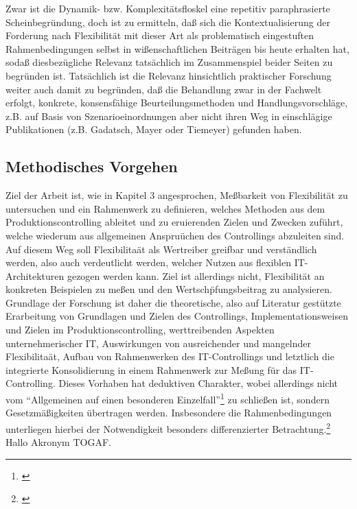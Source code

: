 Zwar ist die Dynamik- bzw. Komplexit\"atsfloskel eine repetitiv paraphrasierte Scheinbegr\"undung, doch ist zu ermitteln, da{\ss} sich die Kontextualisierung der Forderung nach Flexibilit\"at mit dieser Art als problematisch eingestuften Rahmenbedingungen selbst in wi{\ss}enschaftlichen Beitr\"agen bis heute erhalten hat, soda{\ss} diesbez\"ugliche Relevanz tats\"achlich im Zusammenspiel beider Seiten zu begr\"unden ist. 
Tats\"achlich ist die Relevanz hinsichtlich praktischer Forschung weiter auch damit zu begr\"unden, da{\ss} die Behandlung zwar in der Fachwelt erfolgt, konkrete, konsensf\"ahige Beurteilungsmethoden und Handlungsvorschl\"age, z.B. auf Basis von Szenarioeinordnungen aber nicht ihren Weg in einschl\"agige Publikationen (z.B. Gadatsch, Mayer oder Tiemeyer) gefunden haben.


\subsection{Methodisches Vorgehen}
Ziel der Arbeit ist, wie in Kapitel 3 angesprochen, Me{\ss}barkeit von Flexibilit\"at zu untersuchen und ein Rahmenwerk zu definieren, welches Methoden aus dem Produktionscontrolling ableitet und zu eruierenden Zielen und Zwecken zuf\"uhrt, welche wiederum aus allgemeinen Anspru\"uchen des Controllings abzuleiten sind. Auf diesem Weg soll Flexibilita\"at als Wertreiber greifbar und verst\"andlich werden, also auch verdeutlicht werden, welcher Nutzen aus flexiblen IT-Architekturen gezogen werden kann.
Ziel ist allerdings nicht, Flexibilit\"at an konkreten Beispielen zu me{\ss}en und den Wertsch\"pfungsbeitrag zu analysieren.
Grundlage der Forschung ist daher die theoretische, also auf Literatur gest\"utzte Erarbeitung von Grundlagen und Zielen des Controllings, Implementationsweisen und Zielen im Produktionscontrolling, werttreibenden Aspekten unternehmerischer IT, Auswirkungen von ausreichender und mangelnder Flexibilita\"at, Aufbau von Rahmenwerken des IT-Controllings und letztlich die integrierte Konsolidierung in einem Rahmenwerk zur Me{\ss}ung f\"ur das IT-Controlling. 
Dieses Vorhaben hat deduktiven Charakter, wobei allerdings nicht vom ``Allgemeinen auf einen besonderen Einzelfall''\footnote{\cite[S.37]{Sandberg2017}} zu schlie{\ss}en ist, sondern Gesetzm\"a{\ss}igkeiten \"ubertragen werden. 
Insbesondere die Rahmenbedingungen unterliegen hierbei der Notwendigkeit besonders differenzierter Betrachtung.\footnote{\cite[S.37-39]{Sandberg2017}}
Hallo Akronym \gls{TOGAF}.












